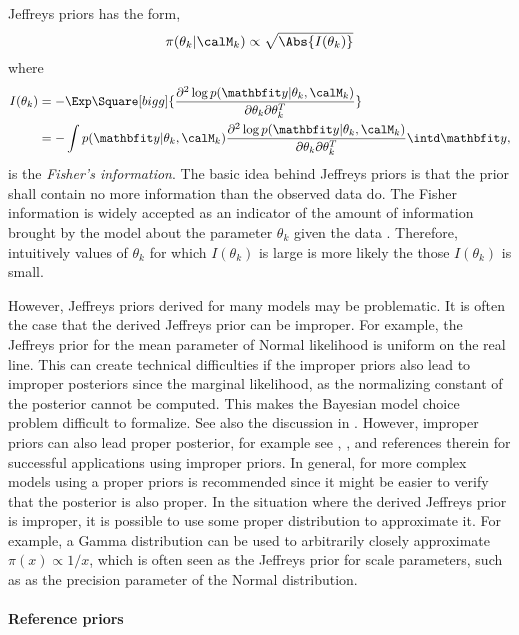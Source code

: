 Jeffreys priors \cite{Jeffreys:1946jf} has the form,
\begin{equation}
  \pi(\theta_k|\calM_k)\propto\sqrt{\Abs{I(\theta_k)}}
\end{equation}
where
\begin{align}
  I(\theta_k)
  &= -\Exp\Square[bigg]{\frac{\partial^2\log p(\data|\theta_k,\calM_k)}
    {\partial\theta_k\partial\theta_k^T}} \notag\\
  &= -\int p(\data|\theta_k,\calM_k)
  \frac{\partial^2\log p (\data|\theta_k,\calM_k)}
  {\partial\theta_k\partial\theta_k^T}\intd\data,
\end{align}
is the \emph{Fisher's information}. The basic idea behind Jeffreys priors is
that the prior shall contain no more information than the observed data do.
The Fisher information is widely accepted as an indicator of the amount of
information brought by the model about the parameter $\theta_k$ given the data
\cite{Fisher:1956vx}. Therefore, intuitively values of $\theta_k$ for which
$I(\theta_k)$ is large is more likely the those $I(\theta_k)$ is small.

However, Jeffreys priors derived for many models may be problematic. It is
often the case that the derived Jeffreys prior can be improper. For example,
the Jeffreys prior for the mean parameter of Normal likelihood is uniform on
the real line. This can create technical difficulties if the improper priors
also lead to improper posteriors since the marginal likelihood, as the
normalizing constant of the posterior cannot be computed. This makes the
Bayesian model choice problem difficult to formalize. See also the discussion
in \cite{Kass:1995vb}. However, improper priors can also lead proper
posterior, for example see \cite[][sec.~2.9]{Gelman:2003vx},
\cite[][sec.~1.5]{Robert:2007tc}, \cite{Kass:1995vb} and references therein
for successful applications using improper priors. In general, for more
complex models using a proper priors is recommended since it might be easier
to verify that the posterior is also proper. In the situation where the
derived Jeffreys prior is improper, it is possible to use some proper
distribution to approximate it. For example, a Gamma distribution can be used
to arbitrarily closely approximate $\pi(x)\propto1/x$, which is often seen as
the Jeffreys prior for scale parameters, such as as the precision parameter
of the Normal distribution.

\paragraph{Reference priors}

